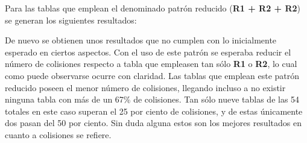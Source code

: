 \documentclass[12pt,spanish,listoffigures,listoftables]{tfgetsinf}
\begin{document}
Para las tablas que emplean el denominado patrón reducido (\textbf{R1 + R2 + R2}) se generan los siguientes resultados:

\def\arraystretch{1.5}
\begin{table}[H]
	\centering
	\caption{Porcentajes de colisiones para las tablas empleando el patrón reducido}
	\label{colpp}
\end{table}

De nuevo se obtienen unos resultados que no cumplen con lo inicialmente esperado en ciertos aspectos. Con el uso de este patrón se esperaba reducir el número de colisiones respecto a tabla que empleasen tan sólo \textbf{R1} o \textbf{R2}, lo cual como puede observarse ocurre con claridad. Las tablas que emplean este patrón reducido poseen el menor número de colisiones, llegando incluso a no existir ninguna tabla con más de un 67\% de colisiones. Tan sólo nueve tablas de las 54 totales en este caso superan el 25 por ciento de colisiones, y de estas únicamente dos pasan del 50 por ciento. Sin duda alguna estos son los mejores resultados en cuanto a colisiones se refiere.
\end{document}
